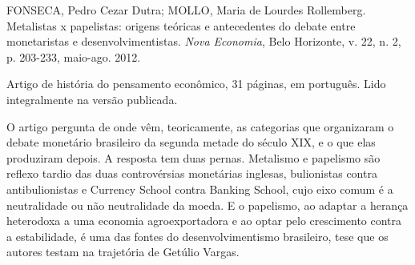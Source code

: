 
\begin{identificacao}
FONSECA, Pedro Cezar Dutra; MOLLO, Maria de Lourdes Rollemberg. Metalistas x
papelistas: origens teóricas e antecedentes do debate entre monetaristas e
desenvolvimentistas. \emph{Nova Economia}, Belo Horizonte, v. 22, n. 2, p.
203-233, maio-ago. 2012.

Artigo de história do pensamento econômico, 31 páginas, em português. Lido
integralmente na versão publicada.
\end{identificacao}

O artigo pergunta de onde vêm, teoricamente, as categorias que organizaram o
debate monetário brasileiro da segunda metade do século XIX, e o que elas
produziram depois. A resposta tem duas pernas. Metalismo e papelismo são
reflexo tardio das duas controvérsias monetárias inglesas, bulionistas contra
antibulionistas e Currency School contra Banking School, cujo eixo comum é a
neutralidade ou não neutralidade da moeda. E o papelismo, ao adaptar a
herança heterodoxa a uma economia agroexportadora e ao optar pelo crescimento
contra a estabilidade, é uma das fontes do desenvolvimentismo brasileiro,
tese que os autores testam na trajetória de Getúlio Vargas.

